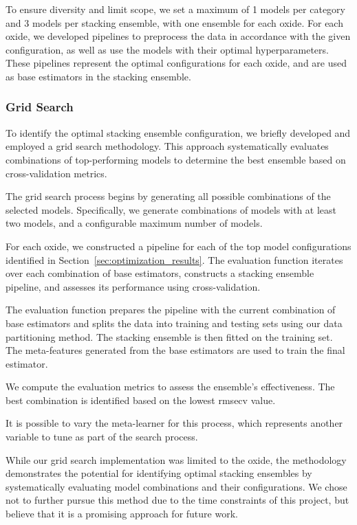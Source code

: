 To ensure diversity and limit scope, we set a maximum of 1 models per category and 3 models per stacking ensemble, with one ensemble for each oxide.
For each oxide, we developed pipelines to preprocess the data in accordance with the given configuration, as well as use the models with their optimal hyperparameters.
These pipelines represent the optimal configurations for each oxide, and are used as base estimators in the stacking ensemble.

\subsubsection{Grid Search}\label{subsec:grid_search}
To identify the optimal stacking ensemble configuration, we briefly developed and employed a grid search methodology.
This approach systematically evaluates combinations of top-performing models to determine the best ensemble based on cross-validation metrics.

The grid search process begins by generating all possible combinations of the selected models.
Specifically, we generate combinations of models with at least two models, and a configurable maximum number of models.

For each oxide, we constructed a pipeline for each of the top model configurations identified in Section~\ref{sec:optimization_results}.
The evaluation function iterates over each combination of base estimators, constructs a stacking ensemble pipeline, and assesses its performance using cross-validation.

The evaluation function prepares the pipeline with the current combination of base estimators and splits the data into training and testing sets using our data partitioning method.
The stacking ensemble is then fitted on the training set.
The meta-features generated from the base estimators are used to train the final estimator.

We compute the evaluation metrics to assess the ensemble's effectiveness.
The best combination is identified based on the lowest \gls{rmsecv} value.

It is possible to vary the meta-learner for this process, which represents another variable to tune as part of the search process.

While our grid search implementation was limited to the  oxide, the methodology demonstrates the potential for identifying optimal stacking ensembles by systematically evaluating model combinations and their configurations.
We chose not to further pursue this method due to the time constraints of this project, but believe that it is a promising approach for future work.


